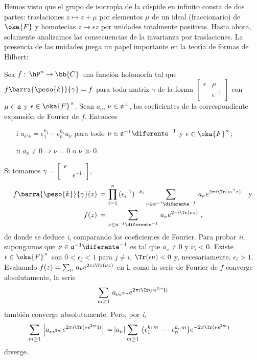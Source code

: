 Hemos visto que el grupo de isotrop\'{\i}a de la c\'{u}spide en
infinito consta de dos partes: traslaciones $z\mapsto z+\mu$ por
elementos $\mu$ de un ideal (fraccionario) de $\oka{F}$ y
homotecias $z\mapsto \epsilon z$ por unidades totalmente positivas.
Hasta ahora, solamente analizamos las consecuencias de la invarianza
por traslaciones. La presencia de las unidades juega un papel
importante en la teor\'{\i}a de formas de Hilbert:

\begin{teoPrincipioDeKoecher}\label{thm:principiodekoecher}
	Sea $f:\,\hP^{n}\rightarrow\bb{C}$ una funci\'{o}n holomorfa
	tal que $f\barra{\peso{k}}{\gamma}=f$ para toda matriz $\gamma$
	de la forma $\begin{bmatrix} \epsilon & \mu \\ %
	& \epsilon^{-1} \end{bmatrix}$ con $\mu\in\frak{a}$ y
	$\epsilon\in\oka{F}^{\times}$. Sean $a_{\nu}$,
	$\nu\in\frak{a}^{\perp}$, los coeficientes de la correspondiente
	expansi\'{o}n de Fourier de $f$. Entonces
	\begin{itemize}
		\item[i] $a_{\epsilon^{2}\nu} =%
			\epsilon_{1}^{k_{1}}\,\cdots\,%
			\epsilon_{n}^{k_{n}}a_{\nu}$ para todo
			$\nu\in\frak{a}^{-1}\diferente^{-1}$ y
			$\epsilon\in\oka{F}^{\times}$;
		\item[ii] $a_{\nu}\not =0\Rightarrow\nu = 0\text{ o }%
			\nu\gg 0$.
	\end{itemize}
\end{teoPrincipioDeKoecher}

Si tomamos $\gamma=\begin{bmatrix} \epsilon & \\ %
& \epsilon^{-1}\end{bmatrix}$,
\begin{align*}
	f\barra{\peso{k}}{\gamma}(z) \,=\, &
	\prod_{i=1}^{n}\,(\epsilon_{i}^{-1})^{-k_{i}}
	\sum_{\nu\in\frak{a}^{-1}\diferente^{-1}}\,
	a_{\nu}e^{2\pi i\Tr(\nu\epsilon^{2}z)}\quad\text{y} \\
	f(z) \,=\, & \sum_{\nu\in\frak{a}^{-1}\diferente^{-1}}\,
	a_{\nu}e^{2\pi i\Tr(\nu z)}
	\text{ ,}
\end{align*}
%
de donde se deduce \textit{i}, comparando los coeficientes de Fourier.
Para probar \textit{ii}, supongamos que $\nu\in\frak{a}^{-1}%
\diferente^{-1}$ es tal que $a_{\nu}\not = 0$ y $\nu_{i}<0$.
Existe $\epsilon\in\oka{F}^{\times}$ con $0<\epsilon_{j}<1$ para
$j\not =i$, $\Tr(\epsilon\nu)<0$ y, necesariamente, $\epsilon_{i}>1$.
Evaluando $f(z)=\sum_{\nu}\,a_{\nu}e^{2\pi i\Tr(\nu z)}$ en
$\mathbf{i}$, como la serie de Fourier de $f$ converge absolutamente,
la serie
\begin{align*}
	\sum_{m\geq 1}\,a_{\nu\epsilon^{2m}}
	e^{2\pi i\Tr(\nu\epsilon^{2m}\mathbf{i})}
\end{align*}
%
tambi\'{e}n converge absolutamente. Pero, por \textit{i},
\begin{align*}
	\sum_{m\geq 1}\,\left|a_{\nu\epsilon^{2m}}
	e^{2\pi i\Tr(\nu\epsilon^{2m}\mathbf{i})}\right|
	\,=\, &|a_{\nu}|\sum_{m\geq 1}\,
	\big(\epsilon_{1}^{k_{1}m}\,\cdots\,\epsilon_{n}^{k_{n}m}\big)
	e^{-2\pi\Tr(\nu\epsilon^{2m})}
\end{align*}
%
diverge.

